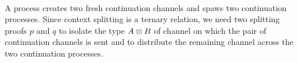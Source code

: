 \begin{AgdaAlign}
\begin{code}%
%
\>[3]%
\>[13]\AgdaSymbol{:}%
\>[1584I]\AgdaSpace{}%
\AgdaSpace{}%
\AgdaSpace{}%
\AgdaSpace{}%
\AgdaSpace{}%
\AgdaSymbol{\}}\AgdaSpace{}%
\AgdaSymbol{(}\AgdaSpace{}%
\AgdaSymbol{:}\AgdaSpace{}%
\AgdaSpace{}%
\AgdaSpace{}%
\AgdaSpace{}%
\AgdaSpace{}%
\AgdaSpace{}%
\AgdaOperator{\AgdaFunction{,}}\AgdaSpace{}%
\AgdaSymbol{)}\AgdaSpace{}%
\AgdaSymbol{(}\AgdaSpace{}%
\AgdaSymbol{:}\AgdaSpace{}%
\AgdaSpace{}%
\AgdaSpace{}%
\AgdaSpace{}%
\AgdaOperator{\AgdaDatatype{+}}\AgdaSpace{}%
\AgdaSymbol{)}\AgdaSpace{}%
\<%
\\
\>[.][@{}l@{}]\<[1584I]%
\>[15]\AgdaSpace{}%
\AgdaSymbol{(}\AgdaSpace{}%
\AgdaSpace{}%
\AgdaSymbol{)}\AgdaSpace{}%
\AgdaSpace{}%
\AgdaSpace{}%
\AgdaSymbol{(}\AgdaSpace{}%
\AgdaSpace{}%
\AgdaSymbol{)}\AgdaSpace{}%
\AgdaSpace{}%
\AgdaSpace{}%
\<%
\end{code}

A  process creates two fresh continuation
channels and spaws two continuation processes. Since context splitting is a
ternary relation, we need two splitting proofs $p$ and $q$ to isolate the type
$A \mathbin\otimes B$ of channel on which the pair of continuation channels is sent and to
distribute the remaining channel across the two continuation processes.

\begin{code}%
%
\>[3]%
\>[13]\AgdaSymbol{:}%
\>[1618I]\AgdaSpace{}%
\AgdaSpace{}%
\AgdaSpace{}%
\AgdaSymbol{\}}\AgdaSpace{}%
\AgdaSymbol{(}\AgdaSpace{}%
\AgdaSymbol{:}\AgdaSpace{}%
\AgdaSpace{}%
\AgdaSpace{}%
\AgdaSpace{}%
\AgdaSpace{}%
\AgdaSpace{}%
\AgdaOperator{\AgdaFunction{,}}\AgdaSpace{}%
\AgdaSymbol{)}\AgdaSpace{}%
\<%
\\
\>[.][@{}l@{}]\<[1618I]%
\>[15]\AgdaSpace{}%
\AgdaSymbol{(}\AgdaSpace{}%
\AgdaSpace{}%
\AgdaSpace{}%
\AgdaSpace{}%
\AgdaSymbol{)}\AgdaSpace{}%
\AgdaSpace{}%
\AgdaSpace{}%
\<%
\end{code}


\end{AgdaAlign}
